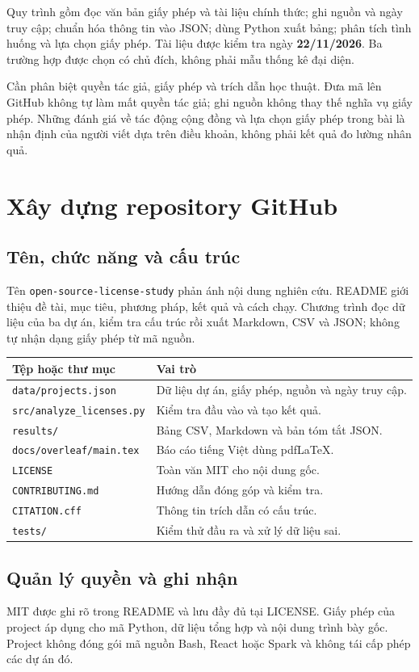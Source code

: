\documentclass[12pt,a4paper]{article}
\begin{document}
Quy trình gồm đọc văn bản giấy phép và tài liệu chính thức; ghi nguồn và ngày truy cập; chuẩn hóa thông tin vào JSON; dùng Python xuất bảng; phân tích tình huống và lựa chọn giấy phép. Tài liệu được kiểm tra ngày \textbf{22/11/2026}. Ba trường hợp được chọn có chủ đích, không phải mẫu thống kê đại diện.

Cần phân biệt quyền tác giả, giấy phép và trích dẫn học thuật. Đưa mã lên GitHub không tự làm mất quyền tác giả; ghi nguồn không thay thế nghĩa vụ giấy phép. Những đánh giá về tác động cộng đồng và lựa chọn giấy phép trong bài là nhận định của người viết dựa trên điều khoản, không phải kết quả đo lường nhân quả.

\section{Xây dựng repository GitHub}
\subsection{Tên, chức năng và cấu trúc}
Tên \texttt{open-source-license-study} phản ánh nội dung nghiên cứu. README giới thiệu đề tài, mục tiêu, phương pháp, kết quả và cách chạy. Chương trình đọc dữ liệu của ba dự án, kiểm tra cấu trúc rồi xuất Markdown, CSV và JSON; không tự nhận dạng giấy phép từ mã nguồn.
\begin{center}
\small
\begin{tabularx}{\textwidth}{@{}p{4.4cm}Y@{}}
\toprule
\textbf{Tệp hoặc thư mục} & \textbf{Vai trò}\\
\midrule
\texttt{data/projects.json} & Dữ liệu dự án, giấy phép, nguồn và ngày truy cập.\\
\texttt{src/analyze\_licenses.py} & Kiểm tra đầu vào và tạo kết quả.\\
\texttt{results/} & Bảng CSV, Markdown và bản tóm tắt JSON.\\
\texttt{docs/overleaf/main.tex} & Báo cáo tiếng Việt dùng pdfLaTeX.\\
\texttt{LICENSE} & Toàn văn MIT cho nội dung gốc.\\
\texttt{CONTRIBUTING.md} & Hướng dẫn đóng góp và kiểm tra.\\
\texttt{CITATION.cff} & Thông tin trích dẫn có cấu trúc.\\
\texttt{tests/} & Kiểm thử đầu ra và xử lý dữ liệu sai.\\
\bottomrule
\end{tabularx}
\end{center}
\subsection{Quản lý quyền và ghi nhận}
MIT được ghi rõ trong README và lưu đầy đủ tại LICENSE. Giấy phép của project áp dụng cho mã Python, dữ liệu tổng hợp và nội dung trình bày gốc. Project không đóng gói mã nguồn Bash, React hoặc Spark và không tái cấp phép các dự án đó.
\end{document}
